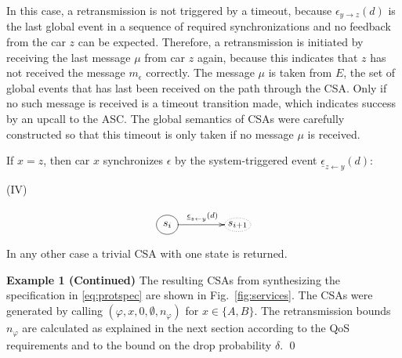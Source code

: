 \documentclass{sig-alternate}
\newenvironment{excont}[1]{\textbf{Example 1 (#1)}}{\qed}
\renewcommand{\v}{\varphi}
\newcommand{\e}{\epsilon}
\renewcommand{\d}{\delta}
\newcommand{\locev}[1]{\underline{#1}}
\newcommand{\sys}[4]{\locev{#1}_{{#2} \leftarrow {#3}}(#4)}
\newcommand{\fig}[1]{Fig.\ \ref{fig:#1}}
\begin{document}
\noindent In this case, a retransmission is not triggered by a timeout, because $\e_{y \rightarrow z}(d)$ is the last global event in a sequence of required synchronizations and no feedback from the car $z$ can be expected. Therefore, a retransmission is initiated by receiving the last message $\mu$ from car $z$ again, because this indicates that $z$ has not received the message $m_{\e}$ correctly. The message $\mu$ is taken from $E$, the set of global events that has last been received on the path through the CSA. Only if no such message is received is a timeout transition made, which indicates success by an upcall to the ASC. The global semantics of CSAs were carefully constructed so that this timeout is only taken if no message $\mu$ is received.

If $x = z$, then car $x$ synchronizes $\e$ by the system-triggered event $\sys{\e}{z}{y}{d}$:

\begin{minipage}{0.1\textwidth}
(IV)
\end{minipage}
\begin{minipage}{0.2\textwidth}
\begin{equation*}
\xymatrix@C=1.5cm@R=1.3cm{*++[o][F-]{s_i} \ar[r]^{\sys{\e}{z}{y}{d}} & *+[o][F.]{s_{i+1}}}
\label{eq:4}
\end{equation*}
\end{minipage}

\noindent In any other case a trivial CSA with one state is returned.

\begin{excont}{Continued}
The resulting CSAs from synthesizing the specification in \eqref{eq:protspec} are shown in \fig{services}. The CSAs were generated by calling {}$(\v, x, 0, \emptyset, n_{\v})$ for $x \in \{A, B\}$. The retransmission bounds $n_{\v}$ are calculated as explained in the next section according to the QoS requirements and to the bound on the drop probability $\d$.
\end{excont}

\newcommand{\tb}{\hspace{0.7cm}}
\end{document}
